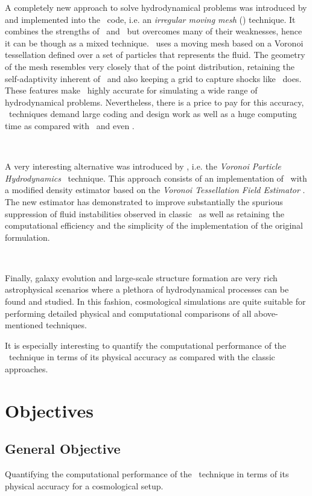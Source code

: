 \documentclass[a4,useAMS,usenatbib,usegraphicx,12pt]{article}
\begin{document}
A completely new approach to solve hydrodynamical problems was introduced by 
\citet{Springel10} and implemented into the \AREPO\ code, i.e. an \textit{
irregular moving mesh} (\IMM) technique. It combines the strengths of \AMR\ and 
\SPH\ but overcomes many of their weaknesses, hence it can be though as a mixed 
technique. \AREPO\ uses a moving mesh based on a Voronoi tessellation defined 
over a set of particles that represents the fluid. The geometry of the mesh 
resembles very closely that of the point distribution, retaining the 
self-adaptivity inherent of \SPH\ and also keeping a grid to capture shocks 
like \AMR\ does. These features make \AREPO\ highly accurate for simulating a 
wide range of hydrodynamical problems. Nevertheless, there is a price to pay 
for this accuracy, \IMM\ techniques demand large coding and design work as well
as a huge computing time as compared with \SPH\ and even \AMR.

\

A very interesting alternative was introduced by \citet{Hess10}, i.e. the 
\textit{Voronoi Particle Hydrodynamics} \VPH\ technique. This approach consists
of an implementation of \SPH\ with a modified density estimator based on the  
\textit{Voronoi Tessellation Field Estimator} \VTFE. The new estimator
has demonstrated to improve substantially the spurious suppression of fluid 
instabilities observed in classic \SPH\ as well as retaining the computational 
efficiency and the simplicity of the implementation of the original formulation.

\

Finally, galaxy evolution and large-scale structure formation are very rich 
astrophysical scenarios where a plethora of hydrodynamical processes can be 
found and studied. In this fashion, cosmological simulations are quite suitable 
for performing detailed physical and computational comparisons of all 
above-mentioned techniques. 


It is especially interesting to quantify the 
computational performance of the \VPH\ technique in terms of its physical 
accuracy as compared with the classic approaches.


\section{Objectives}
\subsection*{General Objective}
Quantifying the computational performance of the \VPH\ technique in terms of 
its physical accuracy for a cosmological setup.
\end{document}

